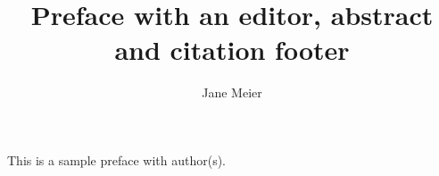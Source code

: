 \documentclass[output=paper]{langsci/langscibook}
\title{Preface with an editor, abstract and citation footer}
\author{Jane Meier  \affiliation{University of Eden}}
\begin{document}
\maketitle

\noindent This is a sample preface with author(s). 

\end{document}
